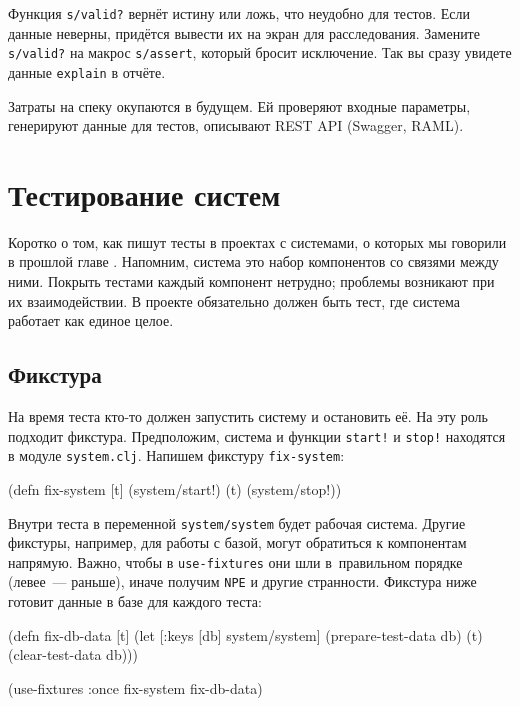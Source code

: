 Функция \verb|s/valid?| вернёт истину или ложь, что неудобно для тестов. Если
данные неверны, придётся вывести их на экран для расследования. Замените
\verb|s/valid?| на макрос \verb|s/assert|, который бросит исключение. Так
вы сразу увидете данные \verb|explain| в отчёте.


Затраты на спеку окупаются в будущем. Ей проверяют входные параметры, генерируют
данные для тестов, описывают REST API (Swagger, RAML).

\section{Тестирование систем}


Коротко о том, как пишут тесты в проектах с системами, о которых мы говорили в
прошлой главе . Напомним, система это набор компонентов со
связями между ними. Покрыть тестами каждый компонент нетрудно; проблемы
возникают при их взаимодействии. В проекте обязательно должен быть тест, где
система работает как единое целое.

\subsection{Фикстура}


На время теста кто-то должен запустить систему и остановить её. На эту роль
подходит фикстура. Предположим, система и функции \verb|start!| и
\verb|stop!| находятся в модуле \verb|system.clj|. Напишем фикстуру
\verb|fix-system|:

\begin{english}
  \begin{clojure}
(defn fix-system [t]
  (system/start!)
  (t)
  (system/stop!))
  \end{clojure}
\end{english}

Внутри теста в переменной \verb|system/system| будет рабочая система. Другие
фикстуры, например, для работы с базой, могут обратиться к компонентам
напрямую. Важно, чтобы в \verb|use-fixtures| они шли в~правильном порядке
(левее~--- раньше), иначе получим \verb|NPE| и другие странности. Фикстура ниже
готовит данные в базе для каждого теста:


\begin{english}
  \begin{clojure}
(defn fix-db-data [t]
  (let [{:keys [db]} system/system]
    (prepare-test-data db)
    (t)
    (clear-test-data db)))

(use-fixtures :once fix-system fix-db-data)
  \end{clojure}
\end{english}

